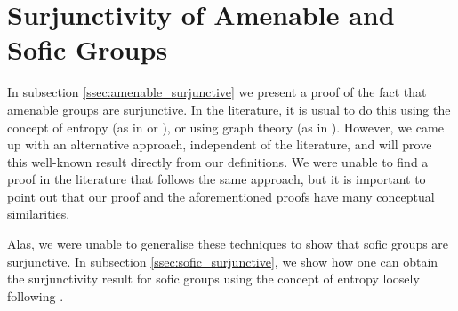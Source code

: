 \documentclass[titlepage, a4paper]{article}
\theoremstyle{theoremdd}
\theoremstyle{definition}
\theoremstyle{remark}
\begin{document}
	
\section{Surjunctivity of Amenable and Sofic Groups}

In subsection \ref{ssec:amenable_surjunctive} we present a proof of the fact that amenable groups are surjunctive. In the literature, it is usual to do this using the concept of entropy (as in \cite[section 4]{kerr_li_2010} or \cite[subsection 2.13]{capraro_lupini_2015}), or using graph theory (as in \cite[section 3]{weiss_2000}). However, we came up with an alternative approach, independent of the literature, and will prove this well-known result directly from our definitions. We were unable to find a proof in the literature that follows the same approach, but it is important to point out that our proof and the aforementioned proofs have many conceptual similarities. 

Alas, we were unable to generalise these techniques to show that sofic groups are surjunctive. In subsection \ref{ssec:sofic_surjunctive}, we show how one can obtain the surjunctivity result for sofic groups using the concept of entropy loosely following \cite[paragraph 2.13.6 - 2.13.7]{capraro_lupini_2015}.
\end{document}
